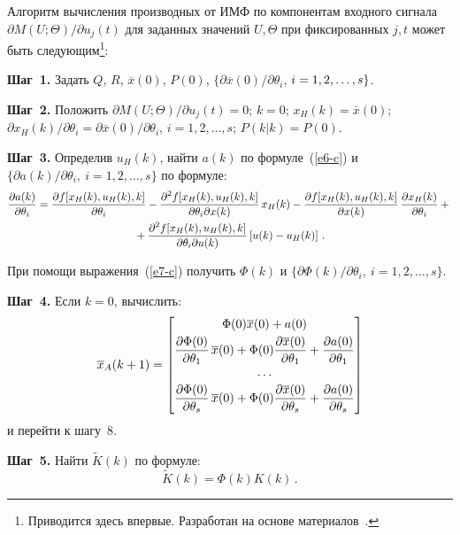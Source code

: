   Алгоритм вычисления производных от ИМФ по компонентам входного
сигнала $\partial M(U;\Theta)/\partial u_j(t)$ для заданных значений $U,\Theta$
при фиксированных $j,t$ может быть следующим\footnote{Приводится здесь
впервые. Разработан на основе материалов~\cite{19-c}.}:

\textbf{Шаг~1.} Задать $Q$, $R$, $\overline{x}(0)$, $P(0)$,
$\{\partial\overline{x}(0)/\partial\theta_i$, $i\hm=1, 2, \ldots , s\}$.

\textbf{Шаг~2.} Положить $\partial M(U;\Theta)/\partial u_j(t)=0$; $k=0$;
$x_H(k)=\overline{x}(0)$; $\partial
x_H(k)/\partial\theta_i=\partial\overline{x}(0)/\partial\theta_i$, $i=1, 2, \ldots , s$;
$P(k\vert k)=P(0)$.


\textbf{Шаг~3.} Определив $u_H(k)$, найти $a(k)$ по формуле~(\ref{e6-c}) и
$\{\partial a(k)/\partial\theta_i, \ i=1, 2, \ldots ,s\}$ по формуле:
  \begin{multline*}
  \displaystyle\frac{\displaystyle \partial a(k)\mathstrut}{\displaystyle \partial\theta_i\mathstrut}=\displaystyle\frac{\displaystyle \partial
f[x_H(k),u_H(k),k]\mathstrut}{\displaystyle \partial\theta_i\mathstrut}-
\displaystyle\frac{\displaystyle \partial^2 f[x_H(k),
u_H(k),k]\mathstrut}{\displaystyle \partial\theta_i\partial x(k)\mathstrut}\,x_H(k)
-\displaystyle\frac{\displaystyle \partial f[x_H(k), u_H(k),k]\mathstrut}{\displaystyle \partial x(k)\mathstrut}\,\displaystyle\frac{\displaystyle \partial
x_H(k)\mathstrut}{\displaystyle \partial\theta_i\mathstrut}+{}\\
{}+\displaystyle\frac{\displaystyle \partial^2 f[x_H(k), u_H(k), k]\mathstrut}{\displaystyle \partial\theta_i \partial
u(k)\mathstrut}\left[ u(k)-u_H(k)\right]\,.
  \end{multline*}
  
При помощи выражения~(\ref{e7-c}) получить $\Phi(k)$ и
$\{\partial\Phi(k)/\partial\theta_i,\ i=1, 2, \ldots ,s\}$.

\textbf{Шаг~4.} Если $k=0$, вычислить:
  $$
  \overline{x}_A(k+1)=
  \begin{bmatrix}
  \Phi(0)\overline{x}(0)+a(0)\\[3pt]
  \displaystyle\frac{\displaystyle \partial\Phi(0)\mathstrut}{\displaystyle \partial\theta_1\mathstrut}\,\overline{x}(0)+\Phi(0)\displaystyle\frac{\displaystyle \partial\overline{x}(
0)\mathstrut}{\displaystyle \partial\theta_1\mathstrut}+\displaystyle\frac{\displaystyle \partial a(0)\mathstrut}{\displaystyle \partial\theta_1\mathstrut}\\[3pt]
  \ldots\\[3pt]
  \displaystyle\frac{\displaystyle \partial\Phi(0)\mathstrut}{\displaystyle \partial\theta_s\mathstrut}\,\overline{x}(0)+\Phi(0)\displaystyle\frac{\displaystyle \partial\overline{x
}(0)\mathstrut}{\displaystyle \partial\theta_s\mathstrut}+\displaystyle\frac{\displaystyle \partial a(0)\mathstrut}{\displaystyle \partial\theta_s\mathstrut}
  \end{bmatrix}
  $$
и перейти к шагу~8.

\textbf{Шаг~5.} Найти $\tilde{K}(k)$ по формуле:
  $$
  \tilde{K}(k)=\Phi(k) K(k)\,.
  $$

